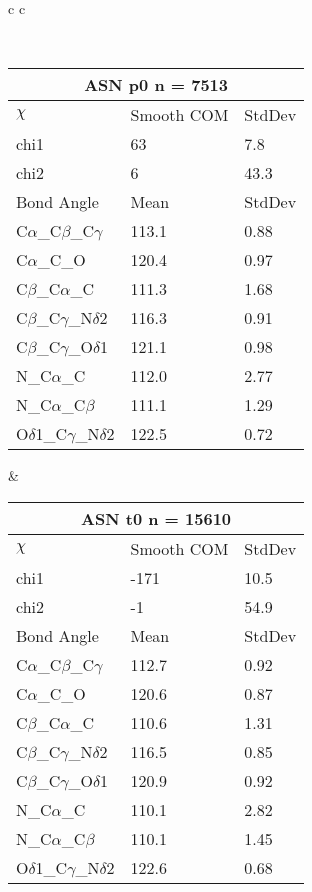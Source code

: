 \begin{longtable}{ c c }

\caption{ASN Central Values}\\
  \begin{tabular}{ l l l }
  \toprule
  \multicolumn{3}{c}{ASN \textbf{p0} n = 7513} \\ \toprule
  $\chi$       & Smooth COM & StdDev \\ \midrule
  chi1 & 63 & 7.8 \\ 
  chi2 & 6 & 43.3 \\ \midrule
  Bond Angle   & Mean     & StdDev \\ \midrule
  C$\alpha$\_C$\beta$\_C$\gamma$ & 113.1 & 0.88\\
  C$\alpha$\_C\_O & 120.4 & 0.97\\
  C$\beta$\_C$\alpha$\_C & 111.3 & 1.68\\
  C$\beta$\_C$\gamma$\_N$\delta$2 & 116.3 & 0.91\\
  C$\beta$\_C$\gamma$\_O$\delta$1 & 121.1 & 0.98\\
  N\_C$\alpha$\_C & 112.0 & 2.77\\
  N\_C$\alpha$\_C$\beta$ & 111.1 & 1.29\\
  O$\delta$1\_C$\gamma$\_N$\delta$2 & 122.5 & 0.72\\
  \bottomrule
  \end{tabular}
  &
  \begin{tabular}{ l l l }
  \toprule
  \multicolumn{3}{c}{ASN \textbf{t0} n = 15610} \\ \toprule
  $\chi$       & Smooth COM & StdDev \\ \midrule
  chi1 & -171 & 10.5 \\ 
  chi2 & -1 & 54.9 \\ \midrule
  Bond Angle   & Mean     & StdDev \\ \midrule
  C$\alpha$\_C$\beta$\_C$\gamma$ & 112.7 & 0.92\\
  C$\alpha$\_C\_O & 120.6 & 0.87\\
  C$\beta$\_C$\alpha$\_C & 110.6 & 1.31\\
  C$\beta$\_C$\gamma$\_N$\delta$2 & 116.5 & 0.85\\
  C$\beta$\_C$\gamma$\_O$\delta$1 & 120.9 & 0.92\\
  N\_C$\alpha$\_C & 110.1 & 2.82\\
  N\_C$\alpha$\_C$\beta$ & 110.1 & 1.45\\
  O$\delta$1\_C$\gamma$\_N$\delta$2 & 122.6 & 0.68\\
  \bottomrule
  \end{tabular}

\end{longtable}
